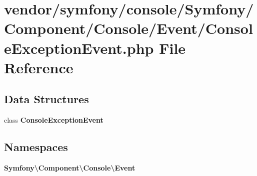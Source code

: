 \section{vendor/symfony/console/\+Symfony/\+Component/\+Console/\+Event/\+Console\+Exception\+Event.php File Reference}
\label{_console_exception_event_8php}
\subsection*{Data Structures}
\begin{DoxyCompactItemize}
\item 
class {\bf Console\+Exception\+Event}
\end{DoxyCompactItemize}
\subsection*{Namespaces}
\begin{DoxyCompactItemize}
\item 
 {\bf Symfony\textbackslash{}\+Component\textbackslash{}\+Console\textbackslash{}\+Event}
\end{DoxyCompactItemize}
